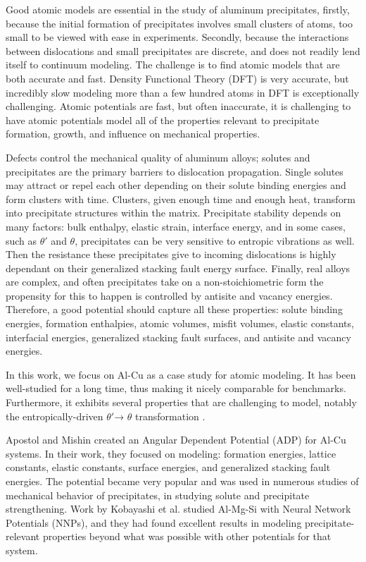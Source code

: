 \documentclass{article}
\begin{document}
Good atomic models are essential in the study of aluminum precipitates, firstly, because the initial formation of precipitates involves small clusters of atoms, too small to be viewed with ease in experiments.
Secondly, because the interactions between dislocations and small precipitates are discrete, and does not readily lend itself to continuum modeling.
The challenge is to find atomic models that are both accurate and fast.
Density Functional Theory (DFT) is very accurate, but incredibly slow modeling more than a few hundred atoms in DFT is exceptionally challenging\cite{Martin2004}.
Atomic potentials are fast, but often inaccurate, it is challenging to have atomic potentials model all of the properties relevant to precipitate formation, growth, and influence on mechanical properties.

Defects control the mechanical quality of aluminum alloys;
solutes and precipitates are the primary barriers to dislocation propagation.
Single solutes may attract or repel each other depending on their solute binding energies and form clusters with time.
Clusters, given enough time and enough heat, transform into precipitate structures within the matrix.
Precipitate stability depends on many factors\cite{Giofre2017}: bulk enthalpy, elastic strain, interface energy, and in some cases, such as $\theta'$ and $\theta$, precipitates can be very sensitive to entropic vibrations as well.
Then the resistance these precipitates give to incoming dislocations is highly dependant on their generalized stacking fault energy surface.
Finally, real alloys are complex, and often precipitates take on a non-stoichiometric form the propensity for this to happen is controlled by antisite and vacancy energies\cite{Kim2018}.
Therefore, a good potential should capture all these properties:
solute binding energies, formation enthalpies, atomic volumes, misfit volumes, elastic constants, interfacial energies, generalized stacking fault surfaces, and antisite and vacancy energies. 

In this work, we focus on Al-Cu as a case study for atomic modeling.
It has been well-studied for a long time\cite{Preston1938StructureAlloys}, thus making it nicely comparable for benchmarks.
Furthermore, it exhibits several properties that are challenging to model, notably the entropically-driven $\theta'$→ $\theta$ transformation \cite{Wolverton2001b}.

Apostol and Mishin created an Angular Dependent Potential (ADP) for Al-Cu systems.
In their work, they focused on modeling: formation energies, lattice constants, elastic constants, surface energies, and generalized stacking fault energies\cite{Apostol2011}.
The potential became very popular and was used in numerous studies of mechanical behavior of precipitates,
in studying solute and precipitate strengthening\cite{Singh2013AnAlloy}\cite{Esteban-Manzanares2019}\cite{Wu2020AtomisticAlloys}.
Work by Kobayashi et al. \cite{Kobayashi2017} studied Al-Mg-Si with Neural Network Potentials (NNPs), and they had found excellent results in modeling precipitate-relevant properties beyond what was possible with other potentials for that system.
\end{document}
